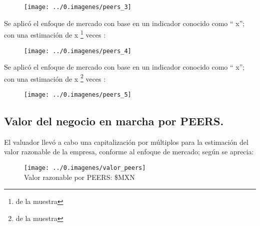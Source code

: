\begin{figure}[H]
\centering
\texttt{[image: ../0.imagenes/peers\_3]}
\end{figure}

\newpage

Se aplic\'o el enfoque de mercado con base en un indicador conocido como ``\textcolor{principal}{\peersd} x''; con una estimaci\'on de \textcolor{principal}{\peersdMult x} \footnote{\peersdEst{} de la muestra} veces \peersdTo:\\

\begin{figure}[H]
\centering
\texttt{[image: ../0.imagenes/peers\_4]}
\end{figure}

\newpage

Se aplic\'o el enfoque de mercado con base en un indicador conocido como ``\textcolor{principal}{\peerse} x''; con una estimaci\'on de \textcolor{principal}{\peerseMult x} \footnote{\peerseEst{} de la muestra} veces \peerseTo:\\

\begin{figure}[H]
\centering
\texttt{[image: ../0.imagenes/peers\_5]}
\end{figure}



\subsection{Valor del negocio en marcha por PEERS.} El valuador llev\'o a cabo una capitalizaci\'on por m\'ultiplos para la estimaci\'on del valor razonable de la empresa, conforme al enfoque de mercado; seg\'un se aprecia: 

\begin{figure}[H]
\centering
\texttt{[image: ../0.imagenes/valor\_peers]}\\

Valor razonable por PEERS: \textcolor{principal}{\$\valorPeers MXN}
\end{figure}